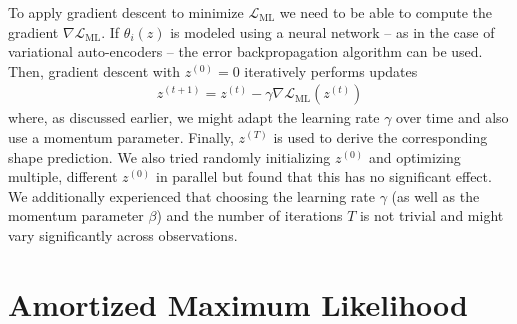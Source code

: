 To apply gradient descent to minimize $\mathcal{L}_{\text{ML}}$
we need to be able to compute the gradient $\nabla \mathcal{L}_{\text{ML}}$.
If $\theta_i(z)$ is modeled using a neural network -- as in the case of
variational auto-encoders -- the error backpropagation algorithm can be used.
Then, gradient descent with $z^{(0)} = 0$ iteratively performs updates
\begin{align}
  z^{(t + 1)} = z^{(t)} - \gamma \nabla \mathcal{L}_{\text{ML}}(z^{(t)})
\end{align}
where, as discussed earlier, we might adapt the learning rate $\gamma$
over time and also use a momentum parameter. Finally, $z^{(T)}$ 
is used to derive the corresponding shape prediction. We also tried randomly
initializing $z^{(0)}$ and optimizing multiple, different $z^{(0)}$
in parallel but found that this has no significant effect. We additionally
experienced that choosing the learning rate $\gamma$ (as well as the momentum
parameter $\beta$) and the number of iterations $T$ is not trivial
and might vary significantly across observations.

\section{Amortized Maximum Likelihood}

